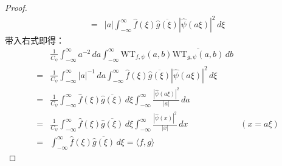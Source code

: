 \documentclass{ctexbook}
\begin{document}
\begin{proof}
\begin{align*}
        =&|a|\int_{-\infty}^{\infty}\hat{f}(\xi)\overline{\hat{g}(\xi)}|\hat{\psi}(a\xi)|^2\,d\xi
    \end{align*}
    带入右式即得：
    \begin{align*}
        &\frac{1}{C_{\psi}}\int_{-\infty}^{\infty}a^{-2}\,da\int_{-\infty}^{\infty}\mathrm{WT} _{f,\psi}(a,b)\overline{\mathrm{WT} _{g,\psi}(a,b)}\,db\\
        =&\frac{1}{C_{\psi}}\int_{-\infty}^{\infty}|a|^{-1}\,da\int_{-\infty}^{\infty}\hat{f}(\xi)\overline{\hat{g}(\xi)}|\hat{\psi}(a\xi)|^2\,d\xi\\
        =&\frac{1}{C_{\psi}}\int_{-\infty}^{\infty}\hat{f}(\xi)\overline{\hat{g}(\xi)}\,d\xi\int_{-\infty}^{\infty}\frac{|\hat{\psi}(a\xi)|^2}{|a|}\,da\\
        =&\frac{1}{C_{\psi}}\int_{-\infty}^{\infty}\hat{f}(\xi)\overline{\hat{g}(\xi)}\,d\xi\int_{-\infty}^{\infty}\frac{|\hat{\psi}(x)|^2}{|x|}\,dx&(x=a\xi)\\
        =&\int_{-\infty}^{\infty}\hat{f}(\xi)\overline{\hat{g}(\xi)}\,d\xi=\langle f,g\rangle
    \end{align*}
\end{proof}
\end{document}
